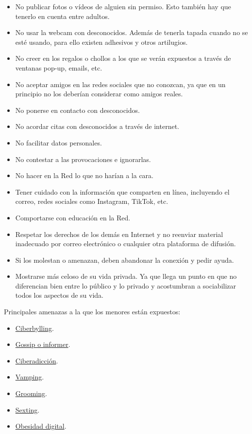 \documentclass[
  a4paper,
  openany]{book}
\begin{document}
\begin{itemize}
\item
  No publicar fotos o vídeos de alguien sin permiso. Esto también hay que tenerlo en cuenta entre adultos.
\item
  No usar la webcam con desconocidos. Además de tenerla tapada cuando no se esté usando, para ello existen adhesivos y otros artilugios.
\item
  No creer en los regalos o chollos a los que se verán expuestos a través de ventanas pop-up, emails, etc.
\item
  No aceptar amigos en las redes sociales que no conozcan, ya que en un principio no los deberían considerar como amigos reales.
\item
  No ponerse en contacto con desconocidos.
\item
  No acordar citas con desconocidos a través de internet.
\item
  No facilitar datos personales.
\item
  No contestar a las provocaciones e ignorarlas.
\item
  No hacer en la Red lo que no harían a la cara.
\item
  Tener cuidado con la información que comparten en línea, incluyendo el correo, redes sociales como Instagram, TikTok, etc.
\item
  Comportarse con educación en la Red.
\item
  Respetar los derechos de los demás en Internet y no reenviar material inadecuado por correo electrónico o cualquier otra plataforma de difusión.
\item
  Si los molestan o amenazan, deben abandonar la conexión y pedir ayuda.
\item
  Mostrarse más celoso de su vida privada. Ya que llega un punto en que no diferencian bien entre lo público y lo privado y acostumbran a sociabilizar todos los aspectos de su vida.
\end{itemize}

Principales amenazas a la que los menores están expuestos:

\begin{itemize}
\item
  \href{https://ayudaenaccion.org/ong/blog/educacion/ciberbullying/}{Ciberbylling}.
\item
  \href{https://educacion2.com/que-es-el-fenomeno-gossip-e-informer/}{Gossip o informer}.
\item
  \href{https://www.aepap.org/sites/default/files/pags._131-142_ciberadicciones.pdf}{Ciberadicción}.
\item
  \href{https://www.educapeques.com/escuela-de-padres/vamping-definicion.html}{Vamping}.
\item
  \href{https://www.is4k.es/necesitas-saber/grooming}{Grooming}.
\item
  \href{https://www.is4k.es/menores-y-sexting}{Sexting}.
\item
  \href{https://www.levantalacabeza.es/obesidad-digital/}{Obesidad digital}.
\end{itemize}
\end{document}
